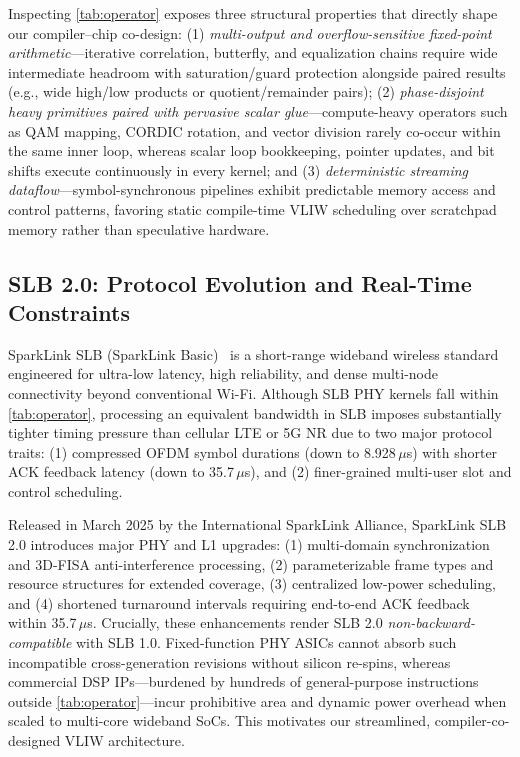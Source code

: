 \documentclass[9pt,conference]{IEEEtran}
\begin{document}
Inspecting \autoref{tab:operator} exposes three structural properties that directly shape our compiler--chip co-design: (1) \textit{multi-output and overflow-sensitive fixed-point arithmetic}---iterative correlation, butterfly, and equalization chains require wide intermediate headroom with saturation/guard protection alongside paired results (e.g., wide high/low products or quotient/remainder pairs); (2) \textit{phase-disjoint heavy primitives paired with pervasive scalar glue}---compute-heavy operators such as QAM mapping, CORDIC rotation, and vector division rarely co-occur within the same inner loop, whereas scalar loop bookkeeping, pointer updates, and bit shifts execute continuously in every kernel; and (3) \textit{deterministic streaming dataflow}---symbol-synchronous pipelines exhibit predictable memory access and control patterns, favoring static compile-time VLIW scheduling over scratchpad memory rather than speculative hardware.

\subsection{SLB 2.0: Protocol Evolution and Real-Time Constraints}

SparkLink SLB (SparkLink Basic)~\cite{gao2023sparklink} is a short-range wideband wireless standard engineered for ultra-low latency, high reliability, and dense multi-node connectivity beyond conventional Wi-Fi. Although SLB PHY kernels fall within \autoref{tab:operator}, processing an equivalent bandwidth in SLB imposes substantially tighter timing pressure than cellular LTE or 5G NR due to two major protocol traits: (1) compressed OFDM symbol durations (down to 8.928\,$\mu$s) with shorter ACK feedback latency (down to 35.7\,$\mu$s), and (2) finer-grained multi-user slot and control scheduling.

Released in March 2025 by the International SparkLink Alliance, SparkLink SLB 2.0 introduces major PHY and L1 upgrades: (1) multi-domain synchronization and 3D-FISA anti-interference processing, (2) parameterizable frame types and resource structures for extended coverage, (3) centralized low-power scheduling, and (4) shortened turnaround intervals requiring end-to-end ACK feedback within 35.7\,$\mu$s. Crucially, these enhancements render SLB 2.0 \textit{non-backward-compatible} with SLB 1.0. Fixed-function PHY ASICs cannot absorb such incompatible cross-generation revisions without silicon re-spins, whereas commercial DSP IPs---burdened by hundreds of general-purpose instructions outside \autoref{tab:operator}---incur prohibitive area and dynamic power overhead when scaled to multi-core wideband SoCs. This motivates our streamlined, compiler-co-designed VLIW architecture.
\end{document}
